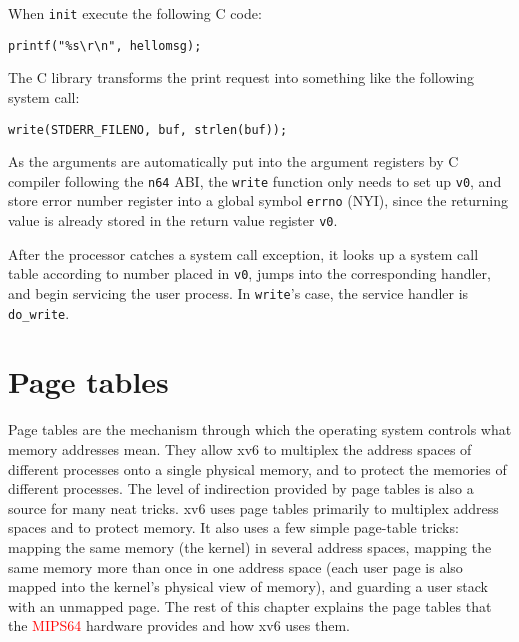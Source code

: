\documentclass{report}
\def \hilite#1{\textcolor{red}{#1}}
\newenvironment{hilight}{\color{red}}{\color{black}}
\begin{document}
\begin{hilight}
		When \texttt{init} execute the following C code:
		\begin{lstlisting}[style=c]
		printf("%s\r\n", hellomsg);
		\end{lstlisting}
		The C library transforms the print request into something like the following system call:
		\begin{lstlisting}[style=c]
		write(STDERR_FILENO, buf, strlen(buf));
		\end{lstlisting}
		As the arguments are automatically put into the argument registers by C compiler following
		the \texttt{n64} ABI, the \texttt{write}
		function only needs to set up \texttt{v0}, and store
		error number register into a global symbol \texttt{errno} (NYI), since the returning value is already
		stored in the return value register \texttt{v0}.
		
		After the processor catches a system call exception,
		it looks up a system call table according
		to number placed in \texttt{v0}, jumps into the corresponding handler, and begin servicing the
		user process.
		In \texttt{write}'s case, the service handler is \texttt{do\_write}.
		\marginpar{
			\footnotesize\ttfamily
			\hilite{fs/write.c}
		}
	\end{hilight}
	
	\chapter{Page tables}
	Page tables are the mechanism through which the operating system controls what
	memory addresses mean. They allow xv6 to multiplex the address spaces of different
	processes onto a single physical memory, and to protect the memories of different
	processes. The level of indirection provided by page tables is also a source for many neat
	tricks. xv6 uses page tables primarily to multiplex address spaces and to protect
	memory. It also uses a few simple page-table tricks: mapping the same memory (the
	kernel) in several address spaces, mapping the same memory more than once in one
	address space (each user page is also mapped into the kernel's physical view of memory),
	and guarding a user stack with an unmapped page. The rest of this chapter explains
	the page tables that the \hilite{MIPS64} hardware provides and how xv6 uses them.
	
\end{document}
